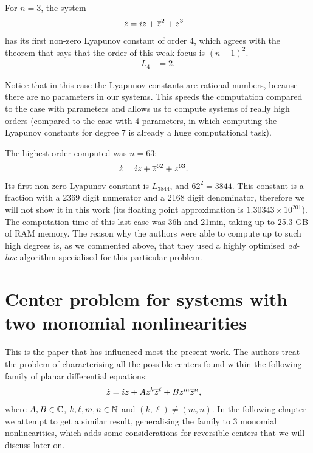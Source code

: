 For $n=3$, the system
\begin{align*}
\dot z &= iz +\overline{z}^2+z^3
\end{align*}
has its first non-zero Lyapunov constant of order 4, which agrees with the theorem that says that the order of this weak focus is $(n-1)^2$.
\begin{align*}
L_4 &= 2.
\end{align*}

\begin{observacio}
Notice that in this case the Lyapunov constants are rational numbers, because there are no parameters in our systems. This speeds the computation compared to the case with parameters and allows us to compute systems of really high orders (compared to the case with 4 parameters, in which computing the Lyapunov constants for degree 7 is already a huge computational task).
\end{observacio}

The highest order computed was $n=63$:
\begin{align}
\dot z &= iz+\overline{z}^{62}+z^{63}.
\end{align}
Its first non-zero Lyapunov constant is $L_{3844}$, and $62^2=3844$. This constant is a fraction with a 2369 digit numerator and a 2168 digit denominator, therefore we will not show it in this work (its floating point approximation is $1.30343\times10^{201}$). The computation time of this last case was 36h and 21min, taking up to 25.3 GB of RAM memory. The reason why the authors were able to compute up to such high degrees is, as we commented above, that they used a highly optimised \emph{ad-hoc} algorithm specialised for this particular problem.











\section{Center problem for systems with two monomial nonlinearities \parencite{Gasull2016}}

This is the paper that has influenced most the present work. The authors treat the problem of characterising all the possible centers found within the following family of planar differential equations:
\begin{align}
\dot z  &= iz + Az^k\overline{z}^\ell+Bz^m\overline{z}^n,
\label{eq.2mono}
\end{align}
where $A,B\in\mathbb{C}$, $k,\ell,m,n\in\mathbb{N}$ and $(k,\ell)\ne(m,n)$. In the following chapter we attempt to get a similar result, generalising the family to 3 monomial nonlinearities, which adds some considerations for reversible centers that we will discuss later on.

